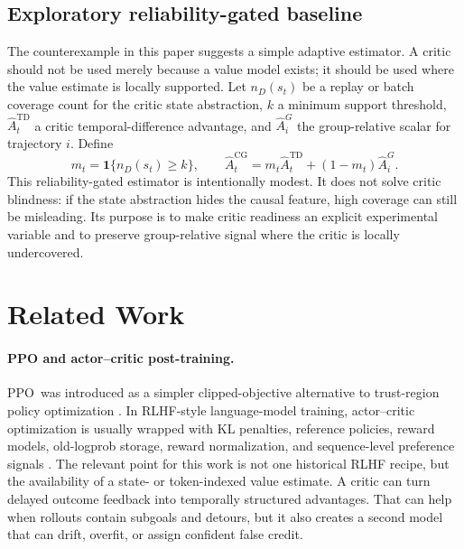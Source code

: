 \documentclass[11pt]{article}
\newcommand{\ppo}{\textsc{PPO}}
\begin{document}
\subsection{Exploratory reliability-gated baseline}

The counterexample in this paper suggests a simple adaptive estimator. A critic
should not be used merely because a value model exists; it should be used where
the value estimate is locally supported. Let $n_D(s_t)$ be a replay or batch
coverage count for the critic state abstraction, $k$ a minimum support
threshold, $\hat A^{\mathrm{TD}}_t$ a critic temporal-difference advantage, and
$\hat A^{G}_i$ the group-relative scalar for trajectory $i$. Define
\begin{equation}
m_t = \mathbf{1}\{n_D(s_t) \ge k\}, \qquad
\hat A^{\mathrm{CG}}_t =
m_t \hat A^{\mathrm{TD}}_t + (1-m_t)\hat A^{G}_i .
\end{equation}
This reliability-gated estimator is intentionally modest. It does not solve
critic blindness: if the state abstraction hides the causal feature, high
coverage can still be misleading. Its purpose is to make critic readiness an
explicit experimental variable and to preserve group-relative signal where the
critic is locally undercovered.

\section{Related Work}

\paragraph{PPO and actor--critic post-training.}
\ppo\ was introduced as a simpler clipped-objective alternative to
trust-region policy optimization \citep{schulman2017ppo}. In RLHF-style
language-model training, actor--critic optimization is usually wrapped with KL
penalties, reference policies, reward models, old-logprob storage, reward
normalization, and sequence-level preference signals
\citep{ouyang2022instructgpt,stiennon2020summarize}. The relevant point for
this work is not one historical RLHF recipe, but the availability of a state-
or token-indexed value estimate. A critic can turn delayed outcome feedback
into temporally structured advantages. That can help when rollouts contain
subgoals and detours, but it also creates a second model that can drift,
overfit, or assign confident false credit.
\end{document}
